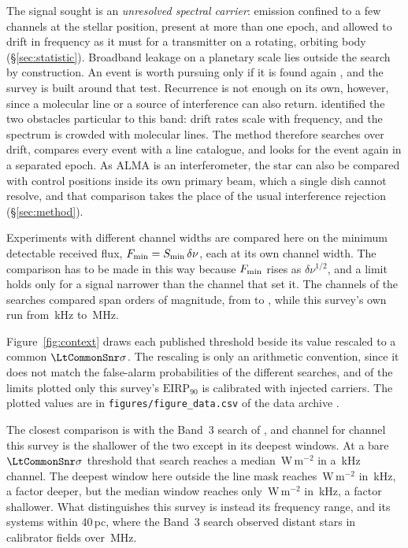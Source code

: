 The signal sought is an \emph{unresolved spectral carrier}: emission confined
to a few channels at the stellar position, present at more than one epoch,
and allowed to drift in frequency as it must for a transmitter on a rotating,
orbiting body (\S\ref{sec:statistic}). Broadband leakage on a planetary scale
\citep{BRaTs2026} lies outside the search by construction. An event is worth
pursuing only if it is found again \citep{Sheikh2021}, and the survey is
built around that test. Recurrence is not enough on its own, however, since
a molecular line or a source of interference can also return. \citet{Mason2025} identified the two
obstacles particular to this band: drift rates scale with frequency, and the
spectrum is crowded with molecular lines. The method therefore searches over
drift, compares every event with a line catalogue, and looks for the event
again in a separated epoch. As ALMA is an interferometer, the star can
also be compared with control positions inside its own primary beam, which a
single dish cannot resolve, and that comparison takes the place of the usual
interference rejection (\S\ref{sec:method}).

Experiments with different channel widths are compared here on the minimum
detectable received flux, $F_{\rm min}=S_{\rm min}\,\delta\nu$, each at its
own channel width. The comparison has to be made in this way because
$F_{\rm min}$ rises as $\delta\nu^{1/2}$, and a limit holds only for a signal
narrower than the channel that set it. The channels of the searches compared
span \LtChanSpanDex{} orders of magnitude, from \LtChanNarrow{} to
\LtChanWide, while this survey's own run from \SzChanFinestKHz\,kHz to
\SzChanWidestMHz\,MHz.

Figure~\ref{fig:context} draws each published threshold beside its value
rescaled to a common $\LtCommonSnr\sigma$. The rescaling is only an
arithmetic convention, since it does not match the false-alarm
probabilities of the different searches, and of the limits plotted only this
survey's $\mathrm{EIRP}_{90}$ is calibrated with injected carriers. The
plotted values are in \texttt{figures/figure\_data.csv} of the data archive
\citep{SIdeposit}.

The closest comparison is with the Band~3 search of \citet{Mason2025}, and
channel for channel this survey is the shallower of the two except in its
deepest windows. At a bare $\LtCommonSnr\sigma$ threshold that search reaches
a median \MasonFluxMed\,W\,m$^{-2}$ in a \MasonChanKHz\,kHz channel. The
deepest window here outside the line mask reaches \FluxTrigBest\,W\,m$^{-2}$
in \FluxChanBestKHz\,kHz, a factor \FluxNatBestRatio{} deeper, but the median
window reaches only \FluxTrigMed\,W\,m$^{-2}$ in \FluxChanMedKHz\,kHz, a
factor \FluxNatMedRatio{} shallower. What distinguishes this survey is
instead its frequency range, and its \NSysClassA{} systems within 40\,pc,
where the Band~3 search observed distant stars in \MasonNCal{} calibrator
fields over \MasonBandMHz\,MHz.
